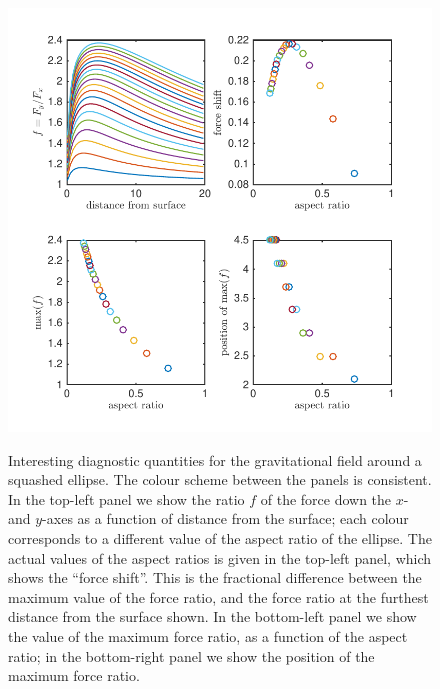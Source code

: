 \documentclass[amsmath,amssymb,12pt,eqsecnum]{revtex4}
\begin{document}
\begin{figure}[!t]
      \begin{center}
{\includegraphics[scale=1,angle=0]{images/p2222}}
      \end{center}
\caption{ Interesting diagnostic quantities for the gravitational field around a squashed ellipse. The colour scheme between the panels is consistent. In the top-left panel we show the ratio $f$ of the force down the $x$- and $y$-axes as a function of distance from the surface; each colour corresponds to a different value of the aspect ratio of the ellipse. The actual values of the aspect ratios is given in the top-left panel, which shows the ``force shift''. This is the fractional difference between the maximum value of the force ratio, and the force ratio at the furthest distance from the surface shown. In the bottom-left panel we show the value of the maximum force ratio, as a function of the aspect ratio; in the bottom-right panel we show the position of the maximum force ratio. }\label{fig:squish-ellipse-grav}
\end{figure}
\end{document}
